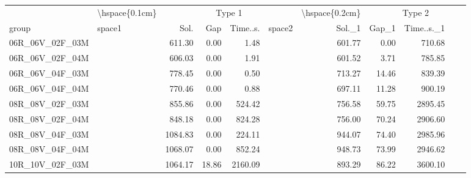 
\begin{tabular}{llrrrlrrr}
\toprule
\multicolumn{1}{c}{} & \multicolumn{1}{c}{\textbackslash{}hspace\{0.1cm\}} & \multicolumn{4}{c}{Type 1} & \multicolumn{1}{c}{\textbackslash{}hspace\{0.2cm\}} & \multicolumn{4}{c}{Type 2} \\
\cmidrule(l{3pt}r{3pt}){2-2} \cmidrule(l{3pt}r{3pt}){3-6} \cmidrule(l{3pt}r{3pt}){7-7} \cmidrule(l{3pt}r{3pt}){8-11}
group & space1 & Sol. & Gap & Time..s. & space2 & Sol.\_1 & Gap\_1 & Time..s.\_1\\
\midrule
06R\_06V\_02F\_03M & \hspace{0.1cm} & 611.30 & 0.00 & 1.48 & \hspace{0.2cm} & 601.77 & 0.00 & 710.68\\
06R\_06V\_02F\_04M & \hspace{0.1cm} & 606.03 & 0.00 & 1.91 & \hspace{0.2cm} & 601.52 & 3.71 & 785.85\\
06R\_06V\_04F\_03M & \hspace{0.1cm} & 778.45 & 0.00 & 0.50 & \hspace{0.2cm} & 713.27 & 14.46 & 839.39\\
06R\_06V\_04F\_04M & \hspace{0.1cm} & 770.46 & 0.00 & 0.88 & \hspace{0.2cm} & 697.11 & 11.28 & 900.19\\
\addlinespace
08R\_08V\_02F\_03M & \hspace{0.1cm} & 855.86 & 0.00 & 524.42 & \hspace{0.2cm} & 756.58 & 59.75 & 2895.45\\
08R\_08V\_02F\_04M & \hspace{0.1cm} & 848.18 & 0.00 & 824.28 & \hspace{0.2cm} & 756.00 & 70.24 & 2906.60\\
08R\_08V\_04F\_03M & \hspace{0.1cm} & 1084.83 & 0.00 & 224.11 & \hspace{0.2cm} & 944.07 & 74.40 & 2985.96\\
08R\_08V\_04F\_04M & \hspace{0.1cm} & 1068.07 & 0.00 & 852.24 & \hspace{0.2cm} & 948.73 & 73.99 & 2946.62\\
\addlinespace
10R\_10V\_02F\_03M & \hspace{0.1cm} & 1064.17 & 18.86 & 2160.09 & \hspace{0.2cm} & 893.29 & 86.22 & 3600.10\\

\end{tabular}
